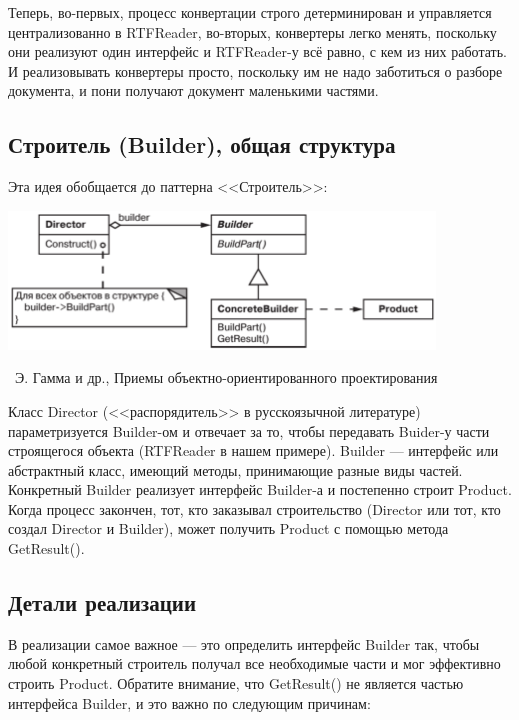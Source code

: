 \documentclass[a5paper]{article}
\newcommand{\attribution}[1] {
    \vspace{-5mm}\begin{flushright}\begin{scriptsize}%
    {\textcopyright\, #1}\end{scriptsize}\end{flushright}
}
\begin{document}
Теперь, во-первых, процесс конвертации строго детерминирован и управляется централизованно в RTFReader, во-вторых, конвертеры легко менять, поскольку они реализуют один интерфейс и RTFReader-у всё равно, с кем из них работать. И реализовывать конвертеры просто, поскольку им не надо заботиться о разборе документа, и пони получают документ маленькими частями.

\subsection{Строитель (Builder), общая структура}

Эта идея обобщается до паттерна <<Строитель>>:

\begin{center}
    \includegraphics[width=0.85\textwidth]{builder.png}
    \attribution{Э. Гамма и др., Приемы объектно-ориентированного проектирования}
\end{center}

Класс Director (<<распорядитель>> в русскоязычной литературе) параметризуется Builder-ом и отвечает за то, чтобы передавать Buider-у части строящегося объекта (RTFReader в нашем примере). Builder --- интерфейс или абстрактный класс, имеющий методы, принимающие разные виды частей. Конкретный Builder реализует интерфейс Builder-а и постепенно строит Product. Когда процесс закончен, тот, кто заказывал строительство (Director или тот, кто создал Director и Builder), может получить Product с помощью метода GetResult().

\subsection{Детали реализации}

В реализации самое важное --- это определить интерфейс Builder так, чтобы любой конкретный строитель получал все необходимые части и мог эффективно строить Product. Обратите внимание, что GetResult() не является частью интерфейса Builder, и это важно по следующим причинам:
\end{document}
